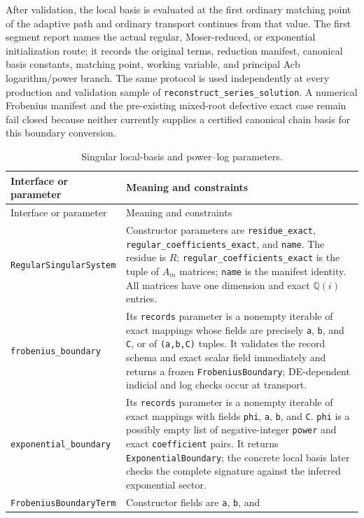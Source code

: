 \documentclass[11pt]{article}
\begin{document}
After validation, the local basis is evaluated at the first ordinary matching point of the
adaptive path and ordinary transport continues from that value.  The first segment report
names the actual regular, Moser-reduced, or exponential initialization route; it records the
original terms, reduction manifest, canonical basis constants, matching point, working
variable, and principal Acb
logarithm/power branch.  The same protocol is used independently at every production
and validation sample of \texttt{reconstruct\_series\_solution}.  A numerical Frobenius
manifest and the pre-existing mixed-root defective exact case remain fail closed because
neither currently supplies a certified canonical chain basis for this boundary conversion.

\small
\begin{longtable}{L{0.36\textwidth}L{0.58\textwidth}}
\caption{Singular local-basis and power--log parameters.}\label{tab:frobenius-api}\\
\toprule
Interface or parameter & Meaning and constraints \\
\midrule
\endfirsthead
\toprule
Interface or parameter & Meaning and constraints \\
\midrule
\endhead
\texttt{RegularSingularSystem} & Constructor parameters are \texttt{residue\_exact},
\texttt{regular\_coefficients\_exact}, and \texttt{name}.  The residue is $R$;
\texttt{regular\_coefficients\_exact} is the tuple of $A_m$ matrices; \texttt{name} is the
manifest identity.  All matrices have one dimension and exact $\mathbb Q(i)$ entries. \\
\texttt{frobenius\_boundary} & Its \texttt{records} parameter is a nonempty iterable of
exact mappings whose fields are precisely \texttt{a}, \texttt{b}, and \texttt{C}, or of
\texttt{(a,b,C)} tuples.  It validates the record schema and exact scalar field immediately
and returns a frozen
\texttt{FrobeniusBoundary}; DE-dependent indicial and log checks occur at transport. \\
\texttt{exponential\_boundary} & Its \texttt{records} parameter is a nonempty iterable of
exact mappings with fields \texttt{phi}, \texttt{a}, \texttt{b}, and \texttt{C}.
\texttt{phi} is a possibly empty list of negative-integer \texttt{power} and exact
\texttt{coefficient} pairs.  It returns \texttt{ExponentialBoundary}; the concrete local
basis later checks the complete signature against the inferred exponential sector. \\
\texttt{FrobeniusBoundaryTerm} & Constructor fields are \texttt{a}, \texttt{b}, and

\end{longtable}
\end{document}
